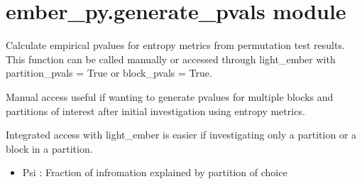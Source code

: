 \documentclass[letterpaper,10pt,english]{sphinxmanual}
\begin{document}
\section{ember\_py.generate\_pvals module}
\label{\detokenize{ember_py:module-ember_py.generate_pvals}}\label{\detokenize{ember_py:ember-py-generate-pvals-module}}

\begin{fulllineitems}
\label{\detokenize{ember_py:ember_py.generate_pvals.generate_pvals}}
\pysigstartsignatures
\pysiglinewithargsret
{}
{\sphinxparamcomma {}\sphinxparamcomma {}\sphinxparamcomma {}\sphinxparamcomma {}\sphinxparamcomma {}\sphinxparamcomma {}\sphinxparamcomma {}\sphinxparamcomma {}\sphinxparamcomma {}\sphinxparamcomma {}\sphinxparamcomma {}\sphinxparamcomma {}\sphinxparamcomma {}}
{}
\pysigstopsignatures
\sphinxAtStartPar
Calculate empirical p\sphinxhyphen{}values for entropy metrics from permutation test results.
This function can be called manually or accessed through light\_ember with
partition\_pvals = True or block\_pvals = True.

\sphinxAtStartPar
Manual access useful if wanting to generate p\sphinxhyphen{}values for multiple blocks and partitions of
interest after initial investigation using entropy metrics.

\sphinxAtStartPar
Integrated access with light\_ember is easier if investigating only a partition or
a block in a partition.
\begin{description}
\begin{itemize}
\item {} 
\sphinxAtStartPar
Psi : Fraction of infromation explained by partition of choice


\end{itemize}
\end{description}
\end{fulllineitems}
\end{document}
